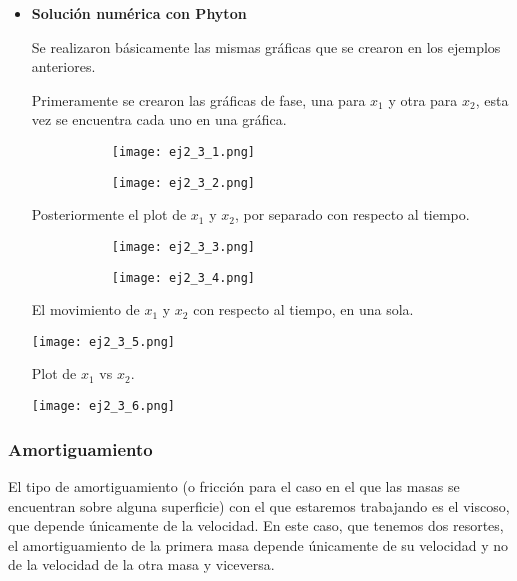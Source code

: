 \documentclass[12pt]{article}
\begin{document}
\begin{itemize}
\begin{itemize}
\item \textbf{Solución numérica con Phyton}

Se realizaron básicamente las mismas gráficas que se crearon en los ejemplos anteriores.

Primeramente se crearon las gráficas de fase, una para $x_1$ y otra para $x_2$, esta vez se encuentra cada uno en una gráfica.

\begin{figure}[h!]
\begin{subfigure}{.55\textwidth}
\centering
\texttt{[image: ej2\_3\_1.png]}
\end{subfigure}
\begin{subfigure}{.55\textwidth}
\centering
\texttt{[image: ej2\_3\_2.png]}
\end{subfigure}
\end{figure}

\clearpage
Posteriormente el plot de $x_1$ y $x_2$, por separado con respecto al tiempo. 

\begin{figure}[h!]
\begin{subfigure}{.55\textwidth}
\centering
\texttt{[image: ej2\_3\_3.png]}
\end{subfigure}
\begin{subfigure}{.55\textwidth}
\centering
\texttt{[image: ej2\_3\_4.png]}
\end{subfigure}
\end{figure}

El movimiento de $x_1$ y $x_2$ con respecto al tiempo, en una sola.

\begin{center}
        \texttt{[image: ej2\_3\_5.png]}
\end{center}

Plot de $x_1$ vs $x_2$.

\begin{center}
        \texttt{[image: ej2\_3\_6.png]}
\end{center}

\end{itemize}


\end{itemize}

\subsubsection{Amortiguamiento}
El tipo de amortiguamiento (o fricción para el caso en el que las masas se encuentran sobre alguna superficie) con el que estaremos trabajando es el viscoso, que depende únicamente de la velocidad. En este caso, que tenemos dos resortes, el amortiguamiento de la primera masa depende únicamente de su velocidad y no de la velocidad de la otra masa y viceversa. \\
\end{document}
